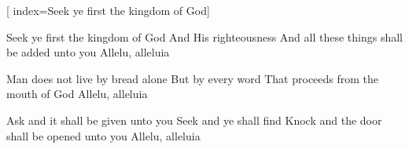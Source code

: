 



[             %
    index={Seek ye first the kingdom of God}]             %

\beginverse                       

\chordsoff  								%

Seek ye first the kingdom of God
And His righteousness
And all these things shall be added unto you
Allelu, alleluia

\endverse

\beginverse                       
\chordsoff  								%

Man does not live by bread alone
But by every word
That proceeds from the mouth of God
Allelu, alleluia

\endverse                         


\beginverse                       
\chordsoff  								%

Ask and it shall be given unto you
Seek and ye shall find
Knock and the door shall be opened unto you
Allelu, alleluia

\endverse                         


\beginverse                       
\chordsoff  								%

